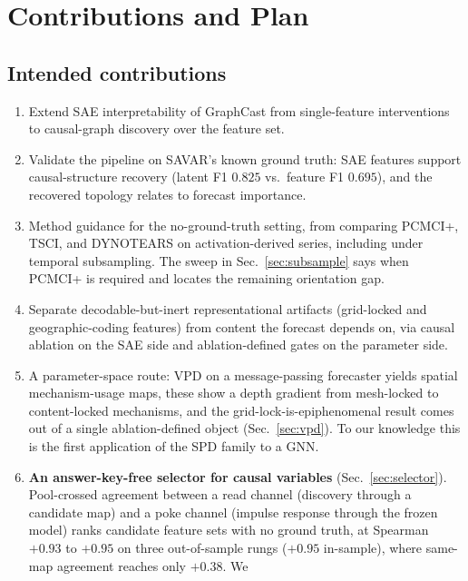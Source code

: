 \section{Contributions and Plan}
\label{sec:contributions}

\subsection{Intended contributions}

\begin{enumerate}[nosep]
  \item Extend SAE interpretability of GraphCast from single-feature
        interventions~\cite{macmillan2025} to causal-graph discovery over the
        feature set.
  \item Validate the pipeline on SAVAR's known ground truth: SAE features support
        causal-structure recovery (latent F1 $0.825$ vs.\ feature F1 $0.695$), and
        the recovered topology relates to forecast importance.
  \item Method guidance for the no-ground-truth setting, from comparing PCMCI+,
        TSCI, and DYNOTEARS on activation-derived series, including under temporal
        subsampling. The sweep in Sec.~\ref{sec:subsample} says when PCMCI+ is
        required and locates the remaining orientation gap.
  \item Separate decodable-but-inert representational artifacts (grid-locked and
        geographic-coding features) from content the forecast depends on, via
        causal ablation on the SAE side and ablation-defined gates on the
        parameter side.
  \item A parameter-space route: VPD on a message-passing forecaster yields
        spatial mechanism-usage maps, these show a depth gradient from mesh-locked
        to content-locked mechanisms, and the grid-lock-is-epiphenomenal result
        comes out of a single ablation-defined object (Sec.~\ref{sec:vpd}). To our
        knowledge this is the first application of the SPD family to a GNN.
  \item \textbf{An answer-key-free selector for causal variables}
        (Sec.~\ref{sec:selector}). Pool-crossed agreement between a read channel
        (discovery through a candidate map) and a poke channel (impulse response
        through the frozen model) ranks candidate feature sets with no ground
        truth, at Spearman $+0.93$ to $+0.95$ on three out-of-sample rungs
        ($+0.95$ in-sample), where same-map agreement reaches only $+0.38$. We

\end{enumerate}
